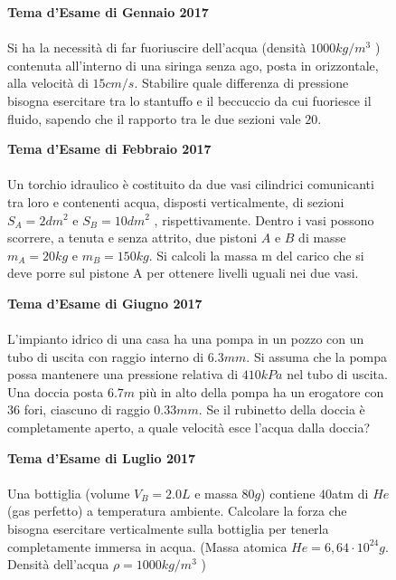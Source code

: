 \begin{figure}[h!]
    \textbf{Tema d'Esame di Gennaio 2017}\\ \\
    Si ha la necessità di far fuoriuscire dell'acqua (densità $1000 kg/m^3$
    ) contenuta all'interno di una siringa senza ago, posta in orizzontale, alla velocità di $15 cm/s$.
     Stabilire quale differenza di pressione bisogna esercitare tra lo stantuffo e il beccuccio da cui fuoriesce il
    fluido, sapendo che il rapporto tra le due sezioni vale $20$. 
\end{figure}

\begin{figure}[h!]
    \textbf{Tema d'Esame di Febbraio 2017}\\ \\
    Un torchio idraulico è costituito da due vasi cilindrici comunicanti tra loro e contenenti acqua, disposti verticalmente, di sezioni $S_A =2 dm^2$  e $S_B = 10 dm^2$ , rispettivamente. Dentro i vasi possono scorrere, a tenuta e senza attrito, due pistoni $A$ e $B$ di masse $m_A = 20 kg$ e $m_B = 150 kg$. Si calcoli la massa m del carico che si deve porre sul pistone A per ottenere livelli uguali nei due vasi.
\end{figure}

\begin{figure}[h!]
    \textbf{Tema d'Esame di Giugno 2017}\\ \\
    L’impianto idrico di una casa ha una pompa in un pozzo con un tubo di uscita con raggio interno di $6.3 mm$. Si assuma che la pompa possa mantenere una pressione relativa di $410 kPa$ nel tubo di uscita. Una doccia posta $6.7 m$ più in alto della pompa ha un erogatore con $36$ fori, ciascuno di raggio $0.33 mm$. Se il rubinetto della doccia è completamente aperto, a quale velocità esce l’acqua dalla doccia?
\end{figure}

\begin{figure}[h!]
    \textbf{Tema d'Esame di Luglio 2017}\\ \\
    Una bottiglia (volume $V_B = 2.0 L$ e massa $80 g$) contiene $40$atm di $He$ (gas perfetto) a temperatura ambiente. Calcolare la forza che bisogna esercitare verticalmente sulla bottiglia per tenerla completamente immersa in acqua. (Massa atomica $He = 6,64\cdot 10^{24} g$. Densità dell’acqua $\rho = 1000 kg/m^3$
    )
\end{figure}